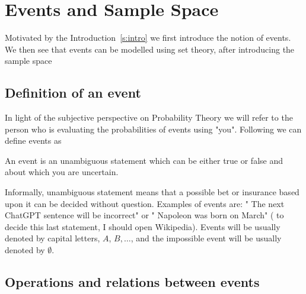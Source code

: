 

\section{Events and Sample Space}
Motivated by the Introduction~\ref{s:intro} we first introduce the notion of events. We then see that events can be modelled using set theory, after introducing the sample space

\subsection{Definition of an event}
In light of the subjective perspective on Probability Theory we will refer to the person who is evaluating the probabilities of events using "you". Following \cite{definetti}  we can define events as 
\begin{definition}
    \label{d:event}
    An event is an unambiguous statement which can be either true or false and about which you are uncertain.
\end{definition}
Informally, unambiguous statement means that a possible bet or insurance based upon it can be decided without question. 
Examples of events are: " The next ChatGPT sentence will be incorrect" or " Napoleon was born on March" ( to decide this last statement, I should open Wikipedia). 
Events will be usually denoted by capital letters, $A$, $B, \ldots$, and the impossible event will be usually denoted by $\emptyset$. 




\subsection{Operations and relations between events}
\label{ss:operations}

